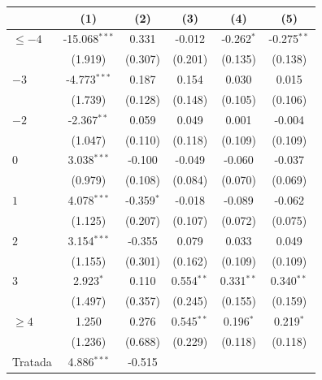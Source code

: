 
\begingroup
\centering
\begin{tabular}{lccccc}
   \toprule
                        & (1)             & (2)          & (3)          & (4)          & (5)\\  
   \midrule 
   $\leq -4$            & -15.068$^{***}$ & 0.331        & -0.012       & -0.262$^{*}$ & -0.275$^{**}$\\   
                        & (1.919)         & (0.307)      & (0.201)      & (0.135)      & (0.138)\\   
   $-3$                 & -4.773$^{***}$  & 0.187        & 0.154        & 0.030        & 0.015\\   
                        & (1.739)         & (0.128)      & (0.148)      & (0.105)      & (0.106)\\   
   $-2$                 & -2.367$^{**}$   & 0.059        & 0.049        & 0.001        & -0.004\\   
                        & (1.047)         & (0.110)      & (0.118)      & (0.109)      & (0.109)\\   
   $0$                  & 3.038$^{***}$   & -0.100       & -0.049       & -0.060       & -0.037\\   
                        & (0.979)         & (0.108)      & (0.084)      & (0.070)      & (0.069)\\   
   $1$                  & 4.078$^{***}$   & -0.359$^{*}$ & -0.018       & -0.089       & -0.062\\   
                        & (1.125)         & (0.207)      & (0.107)      & (0.072)      & (0.075)\\   
   $2$                  & 3.154$^{***}$   & -0.355       & 0.079        & 0.033        & 0.049\\   
                        & (1.155)         & (0.301)      & (0.162)      & (0.109)      & (0.109)\\   
   $3$                  & 2.923$^{*}$     & 0.110        & 0.554$^{**}$ & 0.331$^{**}$ & 0.340$^{**}$\\   
                        & (1.497)         & (0.357)      & (0.245)      & (0.155)      & (0.159)\\   
   $\geq 4$             & 1.250           & 0.276        & 0.545$^{**}$ & 0.196$^{*}$  & 0.219$^{*}$\\   
                        & (1.236)         & (0.688)      & (0.229)      & (0.118)      & (0.118)\\   
   Tratada              & 4.886$^{***}$   & -0.515       &              &              &   \\   

\end{tabular}
